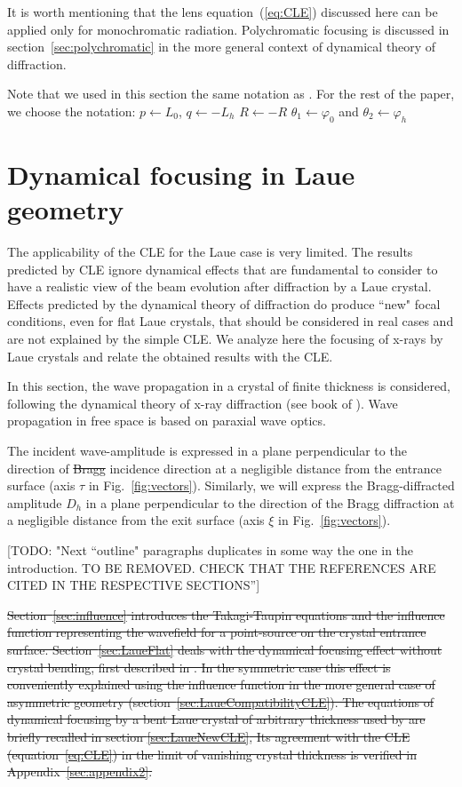 \documentclass[preprint]{iucr}              %
\newcommand{\todo}[1]{{\color{red}[TODO: "#1'']}}
\newcommand{\inblue}[1]{{\color{black}#1}}
\begin{document}
\inblue{It is worth mentioning that the lens equation~(\ref{eq:CLE}) discussed here can be applied only for monochromatic radiation. Polychromatic focusing is discussed in section~\ref{sec:polychromatic} in the more general context of dynamical theory of diffraction.

Note that we used in this section the same notation as \cite{CK}. For the rest of the paper, we choose the notation:    $p \leftarrow L_0$, $q \leftarrow -L_h$ $R \leftarrow -R$ $\theta_1 \leftarrow \varphi_0$ and $\theta_2 \leftarrow \varphi_h$ }

\section{Dynamical focusing in Laue geometry}
\label{sec:dynamlicalLaue}

\inblue{The applicability of the CLE for the Laue case is very limited. The results predicted by CLE ignore dynamical effects that are fundamental to consider to have a realistic view of the beam evolution after diffraction by a Laue crystal. Effects predicted by the dynamical theory of diffraction do produce ``new" focal conditions, even for flat Laue crystals, that should be considered in real cases and are not explained by the simple CLE. We analyze here the focusing of x-rays by Laue crystals and relate the obtained results with the CLE. }

In this section, the wave propagation in a crystal of finite thickness is considered, following the dynamical theory of x-ray diffraction (see book of \cite{authierbook}). Wave propagation in free space is based on paraxial wave optics.

The incident wave-amplitude is expressed in a plane perpendicular to the direction of \sout{Bragg} incidence direction at a negligible distance from the entrance surface \inblue{(axis $\tau$ in Fig.~\ref{fig:vectors}).}
Similarly, we will express the Bragg-diffracted amplitude $D_h$ in a plane perpendicular to the direction of the Bragg diffraction at a negligible distance from the exit surface \inblue{(axis $\xi$ in Fig.~\ref{fig:vectors}).}

\todo{Next ``outline" paragraphs duplicates in some way the one in the introduction. TO BE REMOVED. CHECK THAT THE REFERENCES ARE CITED IN THE RESPECTIVE SECTIONS}

\sout{Section~\ref{sec:influence} introduces the Takagi-Taupin equations and the influence function representing the wavefield for a point-source on the crystal entrance surface.
Section~\ref{sec:LaueFlat} deals with the dynamical focusing effect without crystal bending, first described in \cite{AfanasevKohn1977}. In the symmetric case \cite{kushnir, GuigayFerrero2013} this effect is conveniently explained using the influence function in the more general case of asymmetric geometry (section~\ref{sec:LaueCompatibilityCLE}). 
The equations of dynamical focusing by a bent Laue crystal of arbitrary thickness used by \cite{GuigayFerrero2016} are briefly recalled in section \ref{sec:LaueNewCLE},  Its agreement with the CLE (equation~\ref{eq:CLE}) in the limit of vanishing crystal thickness is verified in Appendix~\ref{sec:appendix2}.}
\end{document}
